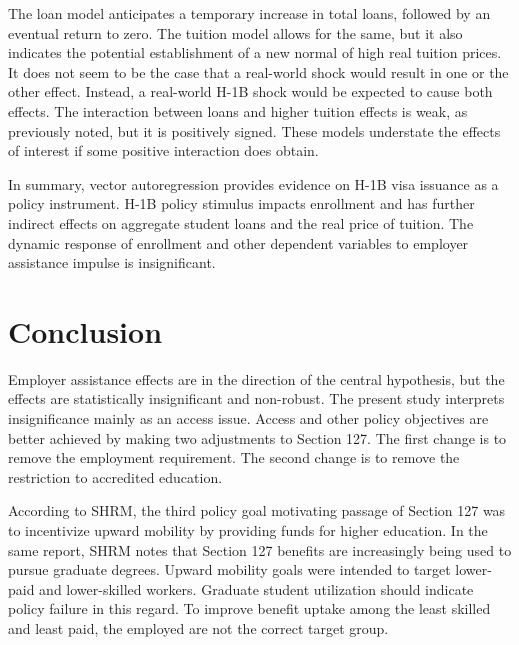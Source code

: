 \documentclass[review]{elsarticle}
\begin{document}
The loan model anticipates a temporary increase in total loans, followed by an eventual return to zero.
The tuition model allows for the same, but it also indicates the potential establishment of a new normal
of high real tuition prices.
It does not seem to be the case that a real-world shock would result in one or the other effect.
Instead, a real-world H-1B shock would be expected to cause both effects.
The interaction between loans and higher tuition effects is weak, as previously noted, but it is positively signed.
These models understate the effects of interest if some positive interaction does obtain.

In summary, vector autoregression provides evidence on H-1B visa issuance as a policy instrument.
H-1B policy stimulus impacts enrollment and has further indirect effects on aggregate student loans and the real price of tuition.
The dynamic response of enrollment and other dependent variables to employer assistance impulse is insignificant.

\section{Conclusion}

Employer assistance effects are in the direction of the central hypothesis,
but the effects are statistically insignificant and non-robust.
The present study interprets insignificance mainly as an access issue.
Access and other policy objectives are better achieved by making two adjustments to Section 127.
The first change is to remove the employment requirement.
The second change is to remove the restriction to accredited education.

According to SHRM\cite{jones_2010}, the third policy goal motivating passage of Section 127 was to incentivize upward mobility by providing funds for higher education.
In the same report, SHRM notes that Section 127 benefits are increasingly being used to pursue graduate degrees.
Upward mobility goals were intended to target lower-paid and lower-skilled workers.
Graduate student utilization should indicate policy failure in this regard.
To improve benefit uptake among the least skilled and least paid, the employed are not the correct target group.
\end{document}
